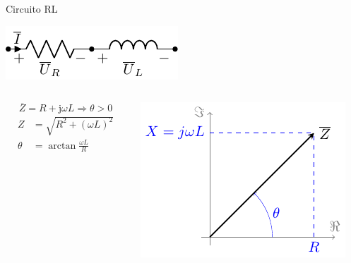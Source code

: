 \documentclass[aspectratio=169, xcolor={usenames,svgnames,dvipsnames}]{beamer}
\begin{document}
\begin{frame}{Circuito RL}
\begin{center}
\includegraphics[height=0.2\textheight]{../figs/RL.pdf}
\end{center}

\begin{columns}
\begin{column}{0.45\columnwidth}
\[
\overline{Z} = R + \mathrm{j}\omega L \Rightarrow \boxed{\theta > 0}
\]
\begin{align*}
    Z &= \sqrt{R^2 + (\omega L)^2}\\
    \theta &= \arctan{\frac{\omega L}{R}}
\end{align*}
\end{column}

\begin{column}{0.55\columnwidth}
\begin{center}
\includegraphics[width=.9\linewidth]{../figs/fasorInductanciaReal.pdf}
\end{center}
\end{column}
\end{columns}
\end{frame}
\end{document}
